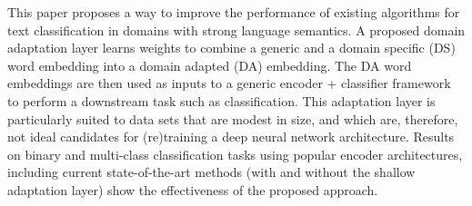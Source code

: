 This paper proposes a way to improve the performance of existing algorithms for
text classification in domains with strong language semantics.
A proposed domain adaptation layer learns weights to combine a generic and a domain
specific (DS) word embedding into a domain adapted (DA) embedding. The DA word embeddings
are then used as inputs to a generic encoder + classifier framework to perform a downstream task such
as classification. This adaptation layer is particularly suited to data sets that are modest in size, and which are, therefore, not ideal candidates for (re)training a deep neural network architecture. Results on binary and multi-class classification tasks using popular encoder architectures, including current state-of-the-art methods (with and without the shallow adaptation layer) show the effectiveness of the proposed approach.
